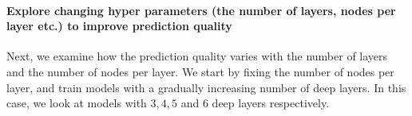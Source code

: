 \documentclass[11pt]{article}
\begin{document}
    \hypertarget{explore-changing-hyper-parameters-the-number-of-layers-nodes-per-layer-etc.-to-improve-prediction-quality}{%
\paragraph{Explore changing hyper parameters (the number of layers,
nodes per layer etc.) to improve prediction
quality}\label{explore-changing-hyper-parameters-the-number-of-layers-nodes-per-layer-etc.-to-improve-prediction-quality}}

    Next, we examine how the prediction quality varies with the number of
layers and the number of nodes per layer. We start by fixing the number
of nodes per layer, and train models with a gradually increasing number
of deep layers. In this case, we look at models with \(3,4,5\) and \(6\)
deep layers respectively.
\end{document}
